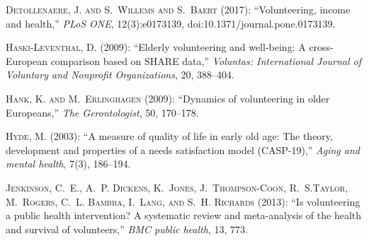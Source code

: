\documentclass[10pt, letterpaper]{article}
\begin{document}
\begin{spacing}{1.4}
\begin{thebibliography}{87}
\textsc{Detollenaere, J. and S.~Willems and S.~Baert} (2017): \enquote{Volunteering, income and health,} \emph{PLoS ONE}, 12(3):e0173139,  doi:10.1371/journal.pone.0173139.

\textsc{Haski-Leventhal, D.} (2009): \enquote{Elderly volunteering and
  well-being: A cross-European comparison based on SHARE data,} \emph{Voluntas:
  International Journal of Voluntary and Nonprofit Organizations}, 20,
  388--404.
  
  
\textsc{Hank, K. and M.~Erlinghagen} (2009): \enquote{Dynamics of volunteering in older Europeans,} \emph{The Gerontologist}, 50, 170--178.  

\textsc{Hyde, M.} (2003): \enquote{A measure of quality of life in early old age: The theory, development and properties of a needs satisfaction model (CASP-19),} \emph{Aging and mental health}, 7(3), 186--194. 


\textsc{Jenkinson, C.~E., A.~P. Dickens, K.~Jones, J.~Thompson-Coon, R.~S.Taylor, M.~Rogers, C.~L. Bambra, I.~Lang, and S.~H. Richards} (2013):
  \enquote{Is volunteering a public health intervention? A systematic review and meta-analysis of the health and survival of volunteers,} \emph{BMC public health}, 13, 773.


\end{thebibliography}
\end{spacing}
\end{document}
